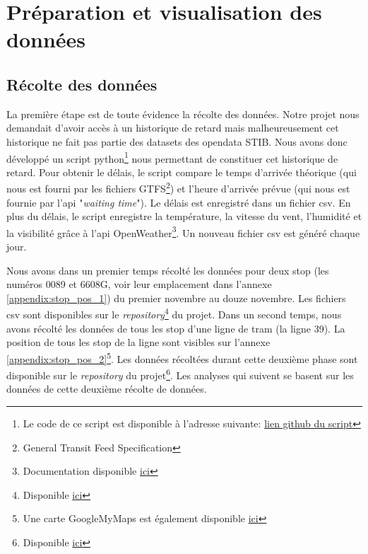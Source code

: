 \chapter{Préparation et visualisation des données}

\section{Récolte des données}
La première étape est de toute évidence la récolte des données. Notre projet nous demandait d'avoir accès à un historique de retard mais malheureusement cet historique ne fait pas partie des datasets des opendata STIB. Nous avons donc développé un script python\footnote{Le code de ce script est disponible à l'adresse suivante: \href{https://github.com/jalbrecq/CanYouCatchIt/blob/main/sandbox/delay_gathering/delay_gathering.py}{lien github du script}} nous permettant de constituer cet historique de retard. Pour obtenir le délais, le script compare le temps d'arrivée théorique (qui nous est fourni par les fichiers GTFS\footnote{General Transit Feed Specification}) et l'heure d'arrivée prévue (qui nous est fournie par l'api "\textit{waiting time}"). Le délais est enregistré dans un fichier csv. En plus du délais, le script enregistre la température, la vitesse du vent, l'humidité et la visibilité grâce à l'api OpenWeather\footnote{Documentation disponible \href{https://openweathermap.org/}{ici}}. Un nouveau fichier csv est généré chaque jour.

Nous avons dans un premier temps récolté les données pour deux stop (les numéros 0089 et 6608G, voir leur emplacement dans l'annexe \ref{appendix:stop_pos_1}) du premier novembre au douze novembre. Les fichiers csv sont disponibles sur le \textit{repository}\footnote{Disponible \href{https://github.com/jalbrecq/CanYouCatchIt/tree/main/sandbox/data/csv}{ici}} du projet. Dans un second temps, nous avons récolté les données de tous les stop d'une ligne de tram (la ligne 39). La position de tous les stop de la ligne sont visibles sur l'annexe \ref{appendix:stop_pos_2}\footnote{Une carte GoogleMyMaps est également disponible \href{https://www.google.com/maps/d/edit?mid=1_qNGPUfuZXrqC3UZXkmDOWuhEHJfYAox&usp=sharing}{ici}}. Les données récoltées durant cette deuxième phase sont disponible sur le \textit{repository} du projet\footnote{Disponible \href{https://github.com/jalbrecq/CanYouCatchIt/tree/main/sandbox/data/csv2}{ici}}. Les analyses qui suivent se basent sur les données de cette deuxième récolte de données.


